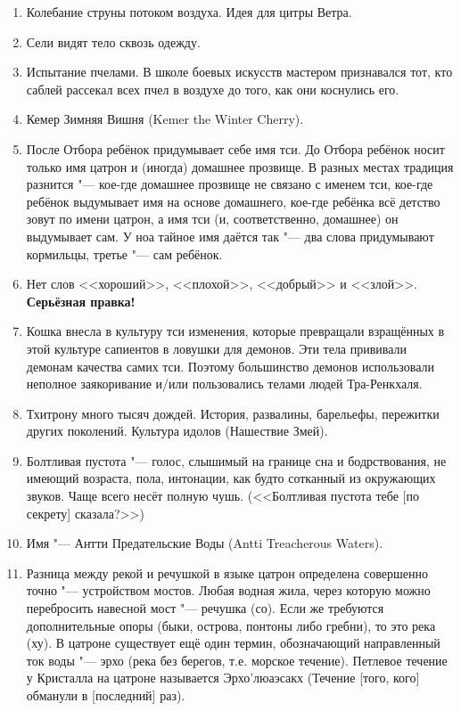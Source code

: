 \documentclass[a4paper,10pt,fleqn]{book}
\begin{document}
\begin{enumerate}
\item Колебание струны потоком воздуха.
Идея для цитры Ветра.

\item Сели видят тело сквозь одежду.

\item Испытание пчелами.
В школе боевых искусств мастером признавался тот, кто саблей рассекал всех пчел в воздухе до того, как они коснулись его.

\item Кемер Зимняя Вишня (Kemer the Winter Cherry).

\item После Отбора ребёнок придумывает себе имя тси.
До Отбора ребёнок носит только имя цатрон и (иногда) домашнее прозвище.
В разных местах традиция разнится "--- кое-где домашнее прозвище не связано с именем тси, кое-где ребёнок выдумывает имя на основе домашнего, кое-где ребёнка всё детство зовут по имени цатрон, а имя тси (и, соответственно, домашнее) он выдумывает сам.
У ноа тайное имя даётся так "--- два слова придумывают кормильцы, третье "--- сам ребёнок.

\item Нет слов <<хороший>>, <<плохой>>, <<добрый>> и <<злой>>.
\textbf{Серьёзная правка!}

\item Кошка внесла в культуру тси изменения, которые превращали взращённых в этой культуре сапиентов в ловушки для демонов.
Эти тела прививали демонам качества самих тси.
Поэтому большинство демонов использовали неполное заякоривание и/или пользовались телами людей Тра-Ренкхаля.

\item Тхитрону много тысяч дождей.
История, развалины, барельефы, пережитки других поколений.
Культура идолов (Нашествие Змей).

\item Болтливая пустота "--- голос, слышимый на границе сна и бодрствования, не имеющий возраста, пола, интонации, как будто сотканный из окружающих звуков.
Чаще всего несёт полную чушь.
(<<Болтливая пустота тебе [по секрету] сказала?>>)

\item Имя "--- Антти Предательские Воды (Antti Treacherous Waters).

\item Разница между рекой и речушкой в языке цатрон определена совершенно точно "--- устройством мостов.
Любая водная жила, через которую можно перебросить навесной мост "--- речушка (со).
Если же требуются дополнительные опоры (быки, острова, понтоны либо гребни), то это река (ху).
В цатроне существует ещё один термин, обозначающий направленный ток воды "--- эрхо (река без берегов, т.е. морское течение).
Петлевое течение у Кристалла на цатроне называется Эрхо'люаэсакх (Течение [того, кого] обманули в [последний] раз).


\end{enumerate}
\end{document}

